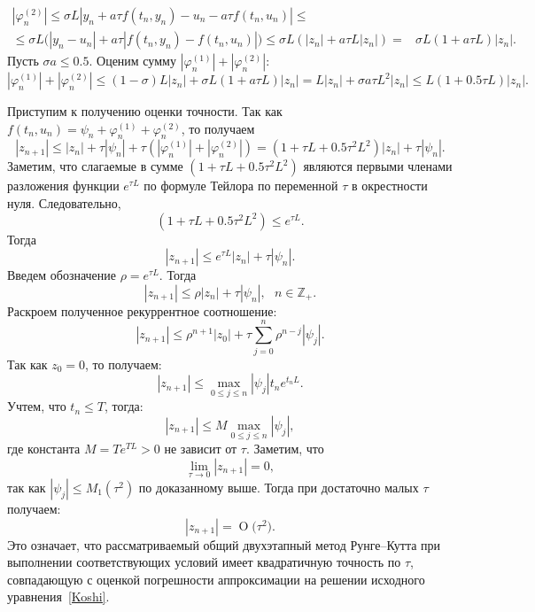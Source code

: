 \documentclass[11pt,a4paper,twoside,listtotoc,bibtotoc]{report}
\numberwithin{equation}{section}
\theoremstyle{definition}
\theoremstyle{plain}
\newcommand{\bigO}[1]{\ensuremath{\operatorname{O}\bigl(#1\bigr)}}
\begin{document}
%
\begin{equation*}
%
    \begin{split}
        |\varphi_n^{(2)}| \leqslant \sigma L|y_n + a\tau f(t_n, y_n) - u_n -
        a\tau f(t_n, u_n)| \leqslant \\
        \leqslant \sigma L\big(|y_n - u_n| + a\tau |f(t_n, y_n) - f(t_n, u_n)|\big)
        \leqslant \sigma L(|z_n| +
        a\tau L|z_n|) =& \sigma L(1 + a\tau L)|z_n|.
    \end{split}
%
\end{equation*}
%
Пусть $\sigma a \leqslant 0.5$.
Оценим сумму $|\varphi_n^{(1)}| + |\varphi_n^{(2)}|$:
%
\begin{equation*}
%
    |\varphi_n^{(1)}| + |\varphi_n^{(2)}| \leqslant (1-\sigma) L|z_n| +
    \sigma L(1 + a\tau L)|z_n| =  L|z_n| + \sigma a\tau L^2|z_n| \leqslant
    L(1 + 0.5\tau L)|z_n|.
%
\end{equation*}
%

Приступим к получению оценки точности.
Так как $f(t_n, u_n) = \psi_n + \varphi_n^{(1)} + \varphi_n^{(2)}$, то получаем
%
$$
    |z_{n+1}| \leqslant |z_n| + \tau|\psi_n| + \tau(|\varphi_n^{(1)}| + |\varphi_n^{(2)}|) =
    (1+\tau L + 0.5\tau^2L^2)|z_n| + \tau|\psi_n|.
$$
%
Заметим, что слагаемые в сумме $(1 + \tau L + 0.5\tau^2L^2)$ являются первыми
членами разложения функции $e^{\tau L}$ по формуле Тейлора по переменной $\tau$
в окрестности нуля.
Следовательно,
%
$$
    (1+\tau L + 0.5\tau^2L^2) \leqslant e^{\tau L}.
$$
%
Тогда
%
$$
    |z_{n+1}| \leqslant e^{\tau L} |z_n| + \tau|\psi_n|.
$$
%
Введем обозначение $\rho = e^{\tau L}$. Тогда
%
\begin{equation}
%
    \label{z_rho_psi}
    |z_{n+1}| \leqslant \rho|z_n| + \tau|\psi_n|,~~~n\in\mathbb{Z}_+.
%
\end{equation}
%
Раскроем полученное рекуррентное соотношение:
%
$$
    |z_{n+1}| \leqslant \rho^{n+1}|z_0| + \tau\sum_{j=0}^n \rho^{n-j}|\psi_j|.
$$
%
Так как $z_0 = 0$, то получаем:
%
\begin{equation}
%
    \label{z_max_psi}
    |z_{n+1}| \leqslant \max_{0 \leqslant j \leqslant n}|\psi_j| t_n e^{t_n L}.
%
\end{equation}
%
Учтем, что $t_n \leqslant T$, тогда:
%
$$
    |z_{n+1}| \leqslant M\max_{0 \leqslant j \leqslant n}|\psi_j|,
$$
%
где константа $M=Te^{TL}>0$ не зависит от $\tau$.
Заметим, что
%
$$
    \lim\limits_{\tau\rightarrow0}|z_{n+1}| = 0,
$$
%
так как $|\psi_j| \leqslant M_1(\tau^2)$ по доказанному выше.
Тогда при достаточно малых $\tau$ получаем:
%
$$
    |z_{n+1}| = \bigO{\tau^2}.
$$
%
Это означает, что рассматриваемый общий двухэтапный метод Рунге--Кутта
при выполнении соответствующих условий
имеет квадратичную точность по $\tau$,
совпадающую с оценкой погрешности аппроксимации на решении исходного уравнения~\eqref{Koshi}.
%
\end{document}
